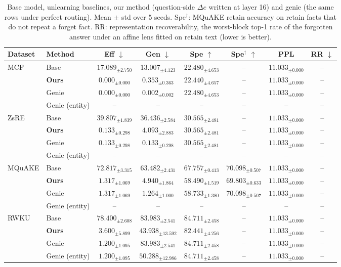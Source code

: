 \begin{table}[t]
\centering
\small
\begin{tabular}{llcccccc}
\toprule
Dataset & Method & Eff $\downarrow$ & Gen $\downarrow$ & Spe $\uparrow$ & Spe$^\dagger$ $\uparrow$ & PPL & RR $\downarrow$ \\
\midrule
\multirow{4}{*}{MCF} & Base & $17.089_{\pm 2.750}$ & $13.007_{\pm 4.123}$ & $22.480_{\pm 4.653}$ & -- & $11.033_{\pm 0.000}$ & -- \\
 & \textbf{Ours} & $0.000_{\pm 0.000}$ & $0.353_{\pm 0.363}$ & $22.440_{\pm 4.657}$ & -- & $11.033_{\pm 0.000}$ & -- \\
 & Genie & $0.000_{\pm 0.000}$ & $0.002_{\pm 0.002}$ & $22.480_{\pm 4.653}$ & -- & $11.033_{\pm 0.000}$ & -- \\
 & Genie (entity) & -- & -- & -- & -- & -- & -- \\
\midrule
\multirow{4}{*}{ZsRE} & Base & $39.807_{\pm 1.839}$ & $36.436_{\pm 2.584}$ & $30.565_{\pm 2.481}$ & -- & $11.033_{\pm 0.000}$ & -- \\
 & \textbf{Ours} & $0.133_{\pm 0.298}$ & $4.093_{\pm 2.883}$ & $30.565_{\pm 2.481}$ & -- & $11.033_{\pm 0.000}$ & -- \\
 & Genie & $0.133_{\pm 0.298}$ & $0.133_{\pm 0.298}$ & $30.565_{\pm 2.481}$ & -- & $11.033_{\pm 0.000}$ & -- \\
 & Genie (entity) & -- & -- & -- & -- & -- & -- \\
\midrule
\multirow{4}{*}{MQuAKE} & Base & $72.817_{\pm 3.315}$ & $63.482_{\pm 2.431}$ & $67.757_{\pm 0.413}$ & $70.098_{\pm 0.507}$ & $11.033_{\pm 0.000}$ & -- \\
 & \textbf{Ours} & $1.317_{\pm 1.069}$ & $4.940_{\pm 1.864}$ & $58.490_{\pm 1.519}$ & $69.803_{\pm 0.633}$ & $11.033_{\pm 0.000}$ & -- \\
 & Genie & $1.317_{\pm 1.069}$ & $1.264_{\pm 1.000}$ & $58.733_{\pm 1.380}$ & $70.098_{\pm 0.507}$ & $11.033_{\pm 0.000}$ & -- \\
 & Genie (entity) & -- & -- & -- & -- & -- & -- \\
\midrule
\multirow{4}{*}{RWKU} & Base & $78.400_{\pm 2.608}$ & $83.983_{\pm 2.541}$ & $84.711_{\pm 2.458}$ & -- & $11.033_{\pm 0.000}$ & -- \\
 & \textbf{Ours} & $3.600_{\pm 5.899}$ & $43.938_{\pm 13.592}$ & $82.441_{\pm 4.256}$ & -- & $11.033_{\pm 0.000}$ & -- \\
 & Genie & $1.200_{\pm 1.095}$ & $83.983_{\pm 2.541}$ & $84.711_{\pm 2.458}$ & -- & $11.033_{\pm 0.000}$ & -- \\
 & Genie (entity) & $1.200_{\pm 1.095}$ & $50.288_{\pm 12.986}$ & $84.711_{\pm 2.458}$ & -- & $11.033_{\pm 0.000}$ & -- \\
\bottomrule
\end{tabular}
\caption{Base model, unlearning baselines, our method (question-side $\Delta e$ written at layer 16) and genie (the same rows under perfect routing). Mean $\pm$ std over 5 seeds. Spe$^\dagger$: MQuAKE retain accuracy on retain facts that do not repeat a forget fact. RR: representation recoverability, the worst-block top-1 rate of the forgotten answer under an affine lens fitted on retain text (lower is better).}
\label{tab:l16_main}
\end{table}
